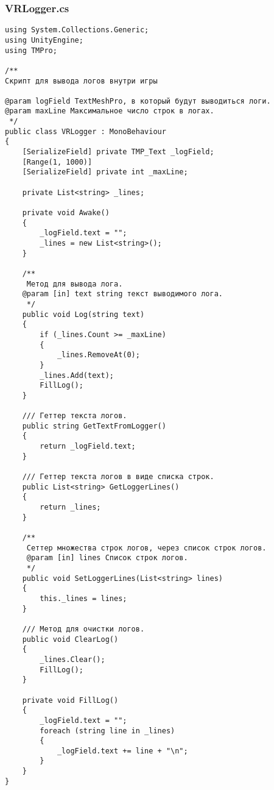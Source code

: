 \subsubsection*{VRLogger.cs}
\begin{verbatim}
﻿using System.Collections.Generic;
using UnityEngine;
using TMPro;

/**
Скрипт для вывода логов внутри игры

@param logField TextMeshPro, в который будут выводиться логи.
@param maxLine Максимальное число строк в логах.
 */
public class VRLogger : MonoBehaviour
{
    [SerializeField] private TMP_Text _logField;
    [Range(1, 1000)]
    [SerializeField] private int _maxLine;

    private List<string> _lines;

    private void Awake()
    {
        _logField.text = "";
        _lines = new List<string>();
    }

    /**
     Метод для вывода лога.
    @param [in] text string текст выводимого лога.
     */
    public void Log(string text)
    {
        if (_lines.Count >= _maxLine)
        {
            _lines.RemoveAt(0);
        }
        _lines.Add(text);
        FillLog();
    }

    /// Геттер текста логов.
    public string GetTextFromLogger()
    {
        return _logField.text;
    }

    /// Геттер текста логов в виде списка строк.
    public List<string> GetLoggerLines()
    {
        return _lines;
    }

    /** 
     Сеттер множества строк логов, через список строк логов.
     @param [in] lines Список строк логов.
     */
    public void SetLoggerLines(List<string> lines)
    {
        this._lines = lines;
    }

    /// Метод для очистки логов.
    public void ClearLog()
    {
        _lines.Clear();
        FillLog();
    }

    private void FillLog()
    {
        _logField.text = "";
        foreach (string line in _lines)
        {
            _logField.text += line + "\n";
        }
    }
}

\end{verbatim}
